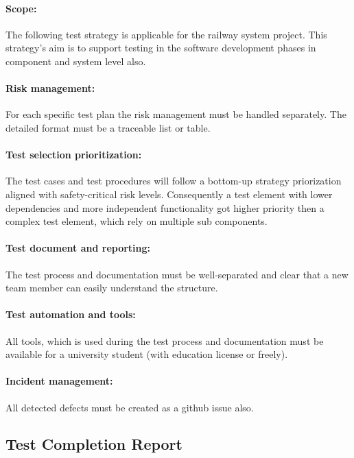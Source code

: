 \paragraph{Scope:} The following test strategy is applicable for the railway system project. This strategy's aim is to support testing in the software development phases in component and system level also.
\paragraph{Risk management:} For each specific test plan the risk management must be handled separately. The detailed format must be a traceable list or table. 
\paragraph{Test selection prioritization:} The test cases and test procedures will follow a bottom-up strategy priorization aligned with safety-critical risk levels. Consequently a test element with lower dependencies and more independent functionality got higher priority then a complex test element, which rely on multiple sub components. 
\paragraph{Test document and reporting:} The test process and documentation must be well-separated and clear that a new team member can easily understand the structure.
\paragraph{Test automation and tools:} All tools, which is used during the test process and documentation must be available for a university student (with education license or freely).
\paragraph{Incident management:} All detected defects must be created as a github issue also.


\subsection{Test Completion Report}


